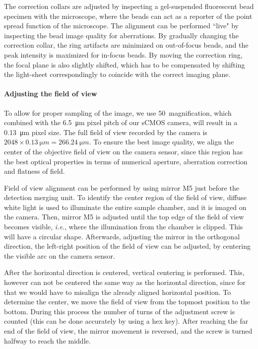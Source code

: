       The correction collars are adjusted by inspecting a gel-suspended fluorescent bead specimen with the microscope, where the beads can act as a reporter of the point spread function of the microscope. The alignment can be performed ``live" by inspecting the bead image quality for aberrations. By gradually changing the correction collar, the ring artifacts are minimized on out-of-focus beads, and the peak intensity is maximized for in-focus beads. By moving the correction ring, the focal plane is also slightly shifted, which has to be compensated by shifting the light-sheet correspondingly to coincide with the correct imaging plane.

    \paragraph{Adjusting the field of view}
      To allow for proper sampling of the image, we use 50\texttimes\ magnification, which combined with the \SI{6.5}{\micro m} pixel pitch of our sCMOS camera, will result in a \SI{0.13}{\micro m} pixel size. The full field of view recorded by the camera is $2048 \times \SI{0.13}{\micro m} = \SI{266.24}{\micro m}$.
      To ensure the best image quality, we align the center of the objective field of view on the camera sensor, since this region has the best optical properties in terms of numerical aperture, aberration correction and flatness of field.

      Field of view alignment can be performed by using mirror M5 just before the detection merging unit. To identify the center region of the field of view, diffuse white light is used to illuminate the entire sample chamber, and it is imaged on the camera. Then, mirror M5 is adjusted until the top edge of the field of view becomes visible, \textit{i.e.}, where the illumination from the chamber is clipped. This will have a circular shape. Afterwards, adjusting the mirror in the orthogonal direction, the left-right position of the field of view can be adjusted, by centering the visible arc on the camera sensor.

      After the horizontal direction is centered, vertical centering is performed. This, however can not be centered the same way as the horizontal direction, since for that we would have to misalign the already aligned horizontal position. To determine the center, we move the field of view from the topmost position to the bottom. During this process the number of  turns of the adjustment screw is counted (this can be done accurately by using a hex key). After reaching the far end of the field of view, the mirror movement is reversed, and the screw is turned halfway to reach the middle.







